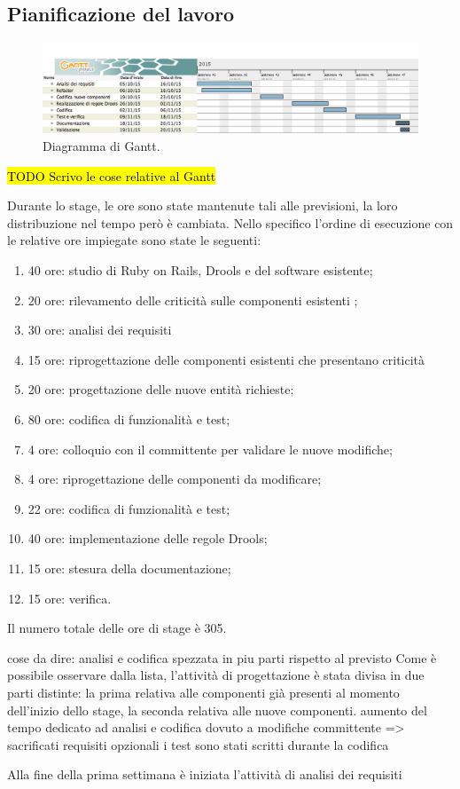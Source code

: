 \subsection{Pianificazione del lavoro}

\begin{figure}[H]
	\begin{center}
		\includegraphics[width=16cm]{Pics/gantt.png}
		\caption{Diagramma di Gantt.}
		\label{fig:Gantt}
	\end{center}
\end{figure}


\hl{TODO Scrivo le cose relative al Gantt}

Durante lo stage, le ore sono state mantenute tali alle previsioni, la loro distribuzione nel tempo però è cambiata. Nello specifico l'ordine di esecuzione con le relative ore impiegate sono state le seguenti:
\begin{enumerate}
	\item	40 ore:     studio di Ruby on Rails, Drools e del software esistente;
	\item	20 ore:     rilevamento delle  criticità sulle componenti esistenti ;
	\item	30 ore:		analisi dei requisiti
	\item	15 ore:		riprogettazione delle componenti esistenti che presentano criticità
	\item	20 ore:     progettazione delle nuove entità richieste;
	\item	80 ore:     codifica di funzionalità e test;
	\item	4 ore:       colloquio con il committente per validare le nuove modifiche;
	\item 	4 ore:		 riprogettazione delle componenti da modificare;
	\item  	22 ore:	 	codifica di funzionalità e test;
	\item	40 ore:		implementazione delle regole Drools;
	\item 	15 ore:		 stesura della documentazione;
	\item	15 ore: 	verifica.
\end{enumerate}

Il numero totale delle ore di stage è 305.

 cose da dire:
 analisi e codifica spezzata in piu parti rispetto al previsto
Come è possibile osservare dalla lista, l'attività di progettazione è stata divisa in due parti distinte:  la prima relativa alle  componenti già presenti al momento dell'inizio dello stage, la seconda relativa alle nuove componenti.
 aumento del tempo dedicato ad analisi e codifica dovuto a modifiche committente
		=> sacrificati requisiti opzionali
 i test sono stati scritti durante la codifica
 



Alla fine della prima settimana è iniziata l'attività di analisi dei requisiti